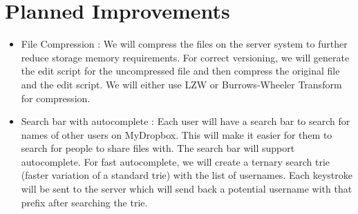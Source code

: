 \documentclass[]{article}
\begin{document}
\section{Planned Improvements}
\begin{itemize}
\item File Compression : We will compress the files on the server system to further reduce storage memory requirements. For correct versioning, we will generate the edit script for the uncompressed file and then compress the original file and the edit script. We will either use LZW or Burrows-Wheeler Transform for compression.
\item Search bar with autocomplete : Each user will have a search bar to search for names of other users on MyDropbox. This will make it easier for them to search for people to share files with. The search bar will support autocomplete. For fast autocomplete, we will create a ternary search trie (faster variation of a standard trie) with the list of usernames. Each keystroke will be sent to the server which will send back a potential username with that prefix after searching the trie.
\end{itemize}
\end{document}
